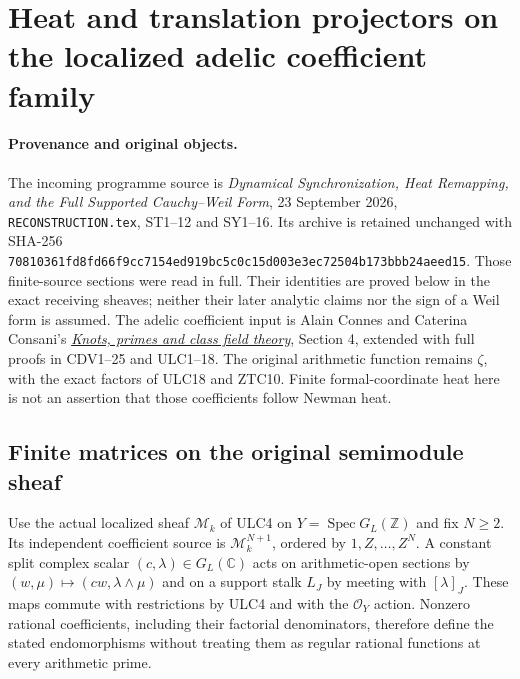 \section{Heat and translation projectors on the localized adelic coefficient family}
\label{sec:cc-localized-shift}

\paragraph{Provenance and original objects.}
The incoming programme source is \emph{Dynamical Synchronization, Heat
Remapping, and the Full Supported Cauchy--Weil Form}, 23 September 2026,
\nolinkurl{RECONSTRUCTION.tex}, ST1--12 and SY1--16. Its archive is retained
unchanged with SHA-256
\nolinkurl{70810361fd8fd66f9cc7154ed919bc5c0c15d003e3ec72504b173bbb24aeed15}.
Those finite-source sections were read in full. Their identities are
proved below in the exact receiving sheaves; neither their later
analytic claims nor the sign of a Weil form is assumed. The adelic
coefficient input is Alain Connes and Caterina Consani's
\href{https://arxiv.org/abs/2501.06560v1}{\emph{Knots, primes and class
field theory}}, Section 4, extended with full proofs in CDV1--25 and
ULC1--18. The original arithmetic function remains $\zeta$, with
the exact factors of ULC18 and ZTC10. Finite formal-coordinate heat
here is not an assertion that those coefficients follow Newman heat.

\subsection{Finite matrices on the original semimodule sheaf}
Use the actual localized sheaf $\mathcal M_k$ of ULC4 on
$Y=\operatorname{Spec}G_L(\mathbb Z)$ and fix $N\ge2$.
Its independent coefficient source is $\mathcal M_k^{N+1}$,
ordered by $1,Z,\ldots,Z^N$. A constant split complex scalar
$(c,\lambda)\in G_L(\mathbb C)$ acts on arithmetic-open sections by
$(w,\mu)\mapsto(cw,\lambda\wedge\mu)$ and on a support stalk
$L_J$ by meeting with $[\lambda]_J$. These maps commute with
restrictions by ULC4 and with the $\mathcal O_Y$ action. Nonzero
rational coefficients, including their factorial denominators,
therefore define the stated endomorphisms without treating them
as regular rational functions at every arithmetic prime.

